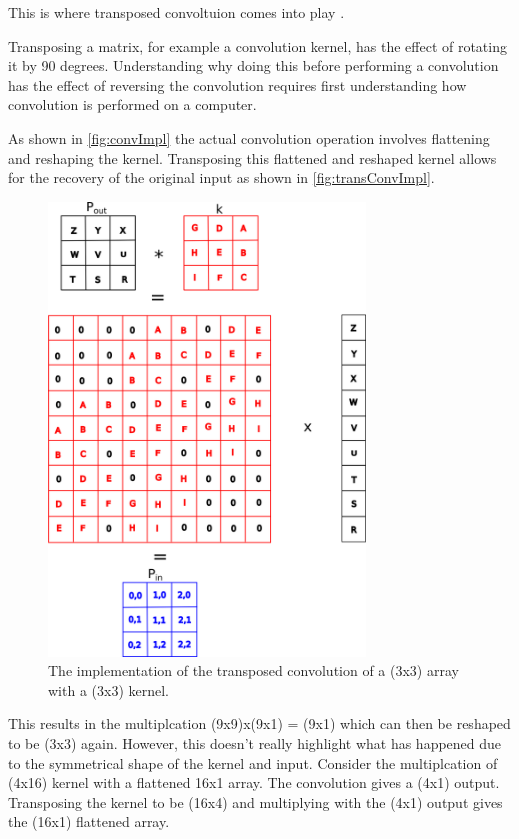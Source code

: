 This is where transposed convoltuion comes into play \cite{zeiler2010deconvolutional}. 

Transposing a matrix, for example a convolution kernel, has the effect of rotating it by 90 degrees. Understanding why doing this before performing a convolution has the effect of reversing the convolution requires first understanding how convolution is performed on a computer.

As shown in \autoref{fig:convImpl} the actual convolution operation involves flattening and reshaping the kernel. Transposing this flattened and reshaped kernel allows for the recovery of the original input as shown in \autoref{fig:transConvImpl}. 

\newpage 

\begin{figure}[h]
	\centering	\includegraphics[width=0.75\textwidth]{Figs/intro2dl/TransconvolutionImplementation.png}
	\caption{The implementation of the transposed convolution of a (3x3) array with a (3x3) kernel.}
	\label{fig:transConvImpl}
\end{figure}

This results in the multiplcation (9x9)x(9x1) = (9x1) which can then be reshaped to be (3x3) again. However, this doesn't really highlight what has happened due to the symmetrical shape of the kernel and input. Consider the multiplcation of (4x16) kernel with a flattened 16x1 array. The convolution gives a (4x1) output. Transposing the kernel to be (16x4) and multiplying with the (4x1) output gives the (16x1) flattened array. 


